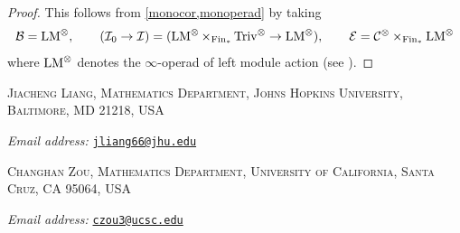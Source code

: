 \documentclass[10pt,a4paper,oneside]{article}
\begin{document}
\begin{proof}
This follows from \cref{monocor,monoperad} by taking
\[
\mathcal{B}=\operatorname{LM}^\otimes,\qquad 
(\mathcal{I}_0\to\mathcal{I})=
(\operatorname{LM}^\otimes\times_{\operatorname{Fin}_*}\operatorname{Triv}^\otimes\to \operatorname{LM}^\otimes),
\qquad
\mathcal{E}=\mathcal{C}^\otimes\times_{\operatorname{Fin}_*}\operatorname{LM}^\otimes
\]
where $\operatorname{LM}^\otimes$ denotes the $\infty$-operad of left module action (see \cite[.1]{ha}).
\end{proof}	

\clearpage
\printbibliography[heading=bibintoc]

\bigskip

\textsc{Jiacheng Liang, Mathematics Department, Johns Hopkins University, Baltimore, MD 21218, USA}

\textit{Email address:} \href{mailto:jliang66@jhu.edu}{\texttt{jliang66@jhu.edu}}

\bigskip

\textsc{Changhan Zou, Mathematics Department, University of California, Santa Cruz, CA 95064, USA}

\textit{Email address:} \href{mailto:czou3@ucsc.edu}{\texttt{czou3@ucsc.edu}}
\end{document}

